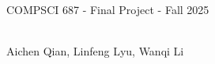 \documentclass{article}
\begin{document}
\newpage
\vspace*{1cm}
\begin{center}
    \begin{Large}
    COMPSCI 687 - Final Project - Fall 2025
    \end{Large}
    \\
    \vspace{0.15cm}
    Aichen Qian, Linfeng Lyu, Wanqi Li
\end{center}




\end{document}
